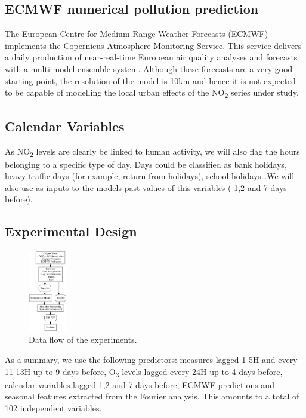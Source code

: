 \documentclass[a4paper,twocolumn,5p]{elsarticle}
\begin{document}
\subsection{ECMWF numerical pollution prediction}
\label{sec:ecmwf-numer-poll}

The European Centre for Medium-Range Weather Forecasts (ECMWF)
implements the Copernicus Atmosphere Monitoring Service.  This service
delivers a daily production of near-real-time European air quality
analyses and forecasts with a multi-model ensemble system. Although
these forecasts are a very good starting point, 
the resolution of the model is 10km
and hence it is not expected to be capable of modelling the local
urban effects of the NO\textsubscript{2} series under study.

\subsection{Calendar Variables}
\label{sec:cal_data}

As NO\textsubscript{2} levels are clearly be linked to human activity,
we will also flag the hours belonging to a specific type of day. Days
could be classified as bank holidays, heavy traffic days (for example,
return from holidays), school holidays\ldots We will also use as
inputs to the models past values of this variables ( 1,2 and 7 days
before).

\subsection{Experimental Design}
\label{sec:experimental-design}

\begin{figure}
  \centering
  \includegraphics[width=0.15\textwidth]{diagrams/flow}
  \caption{\label{figure:dataflow}Data flow of the
    experiments.}
\end{figure}

As a summary, we use the following predictors: \no
measures lagged 1-5H and every 11-13H up to 9 days before,
O\textsubscript{3} levels lagged every 24H up to 4 days before, 
calendar variables lagged 1,2 and 7 days before,
 ECMWF predictions and seasonal features extracted
from the Fourier analysis. This amounts to a total of 102 independent
variables. 
\end{document}
